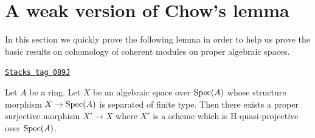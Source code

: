 \section{A weak version of Chow's lemma}
\label{spaces-cohomology-section-weak-chow}
In this section we quickly prove the following lemma in order
to help us prove the basic results on cohomology of coherent
modules on proper algebraic spaces.

\begin{lemma}
\label{spaces-cohomology-lemma-weak-chow}
\href{https://stacks.math.columbia.edu/tag/089J}{\texttt{Stacks tag 089J}}

Let $A$ be a ring. Let $X$ be an algebraic space over $\operatorname{Spec}(A)$
whose structure morphism $X \to \operatorname{Spec}(A)$ is separated of finite type.
Then there exists a proper surjective morphism $X' \to X$
where $X'$ is a scheme which is H-quasi-projective over $\operatorname{Spec}(A)$.
\end{lemma}

